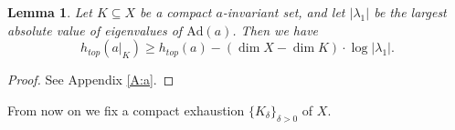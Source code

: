 \documentclass[reqno,12pt]{amsart}
\newtheorem{lemma}[theorem]{Lemma}
\theoremstyle{definition}
\numberwithin{equation}{section}
\newcommand{\RR}{\mathbb{R}}
\newcommand{\TT}{\mathbb{T}}
\newcommand{\NN}{\mathbb{N}}
\newcommand{\ZZ}{\mathbb{Z}}
\newcommand{\bv}{\mathbf{v}}
\newcommand{\Ad}{\mathrm{Ad}}
\newcommand{\Lg}{\mathfrak{g}}
\begin{document}
{%





\begin{lemma}\label{L:entropydim}
	Let $K\subseteq X$ be a compact $a$-invariant set, and {let} $|\lambda_1|$ be the largest absolute value of eigenvalues of $\Ad(a)$. Then we have $$
	h_{top}(a\big|_K)\geq h_{top}(a)-(\dim X-\dim K)\cdot\log|\lambda_1|.
	$$
\end{lemma}
\begin{proof}
    See Appendix \ref{A:a}.
\end{proof}

From now on we fix a compact exhaustion $\{K_\delta\}_{\delta>0}$ of $X$.

}
\end{document}
